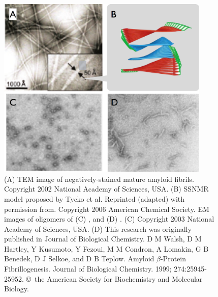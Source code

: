
\begin{figure}
 \centering
 \includegraphics[width=4in]{figures/introduction/fibril_TEM_SSNMR.pdf}
 \caption[EM images of amyloid fibrils and oligomers]{(A) TEM image of negatively-stained mature amyloid fibrils.\cite{Petkova:2002p305} Copyright 2002 National Academy of Sciences, USA. (B) SSNMR model proposed by Tycko et al. Reprinted (adapted) with permission from\cite{Petkova:2006gx}. Copyright 2006 American Chemical Society. EM images of oligomers of (C) ,\cite{Bitan:2003ut} and (D) . (C) Copyright 2003 National Academy of Sciences, USA. (D) This research was originally published in Journal of Biological Chemistry. D M Walsh, D M Hartley, Y Kusumoto, Y Fezoui, M M Condron, A Lomakin, G B Benedek, D J Selkoe, and D B Teplow. Amyloid $\beta$-Protein Fibrillogenesis. Journal of Biological Chemistry. 1999; 274:25945-25952. \copyright\ the American Society for Biochemistry and Molecular Biology.}
 \label{fig:fibril_TEM_SSNMR}
\end{figure}

